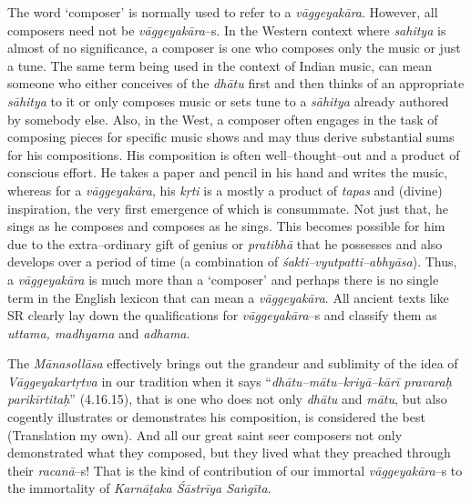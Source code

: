 The word ‘composer’ is normally used to refer to a \textit{vāggeyakāra}. However, all composers need not be \textit{vāggeyakāra}–s. In the Western context where \textit{sahitya} is almost of no significance, a composer is one who composes only the music or just a tune. The same term being used in the context of Indian music, can mean someone who either conceives of the \textit{dhātu} first and then thinks of an appropriate \textit{sāhitya} to it or only composes music or sets tune to a \textit{sāhitya} already authored by somebody else. Also, in the West, a composer often engages in the task of composing pieces for specific music shows and may thus derive substantial sums for his compositions. His composition is often well–thought–out and a product of conscious effort. He takes a paper and pencil in his hand and writes the music, whereas for a \textit{vāggeyakāra}, his \textit{kṛti} is a mostly a product of \textit{tapas} and (divine) inspiration, the very first emergence of which is consummate. Not just that, he sings as he composes and composes as he sings. This becomes possible for him due to the extra–ordinary gift of genius or \textit{pratibhā} that he possesses and also develops over a period of time (a combination of \textit{śakti–vyutpatti–abhyāsa}). Thus, a \textit{vāggeyakāra} is much more than a ‘composer’ and perhaps there is no single term in the English lexicon that can mean a \textit{vāggeyakāra}. All ancient texts like SR clearly lay down the qualifications for \textit{vāggeyakāra}–s and classify them as \textit{uttama, madhyama} and \textit{adhama}.

The \textit{Mānasollāsa} effectively brings out the grandeur and sublimity of the idea of \textit{Vāggeyakartṛtva} in our tradition when it says “\textit{dhātu–mātu–kriyā–kārī pravaraḥ parikīrtitaḥ}” (4.16.15), that is one who does not only \textit{dhātu} and \textit{mātu}, but also cogently illustrates or demonstrates his composition, is considered the best (Translation my own). And all our great saint seer composers not only demonstrated what they composed, but they lived what they preached through their \textit{racanā}–s! That is the kind of contribution of our immortal \textit{vāggeyakāra}–s to the immortality of \textit{Karnāṭaka Śāstrīya Saṅgīta}.

